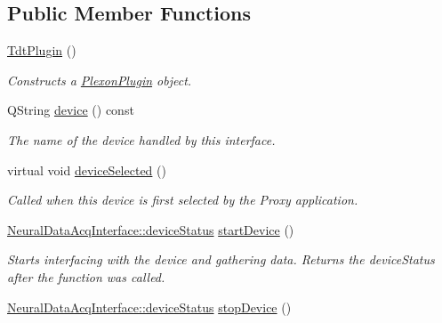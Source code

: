 \subsection*{Public Member Functions}
\begin{DoxyCompactItemize}
\item 
\hypertarget{class_tdt_plugin_a87b239c83c34ea24d4e96633ed293ce8}{\hyperlink{class_tdt_plugin_a87b239c83c34ea24d4e96633ed293ce8}{Tdt\-Plugin} ()}\label{class_tdt_plugin_a87b239c83c34ea24d4e96633ed293ce8}

\begin{DoxyCompactList}\small\item\em Constructs a \hyperlink{class_plexon_plugin}{Plexon\-Plugin} object. \end{DoxyCompactList}\item 
\hypertarget{class_tdt_plugin_aa88fcee8761632906f9a83c1f2a249ca}{Q\-String \hyperlink{class_tdt_plugin_aa88fcee8761632906f9a83c1f2a249ca}{device} () const }\label{class_tdt_plugin_aa88fcee8761632906f9a83c1f2a249ca}

\begin{DoxyCompactList}\small\item\em The name of the device handled by this interface. \end{DoxyCompactList}\item 
\hypertarget{class_tdt_plugin_a116c79f3b024cb4fe2077cae0afe36e1}{virtual void \hyperlink{class_tdt_plugin_a116c79f3b024cb4fe2077cae0afe36e1}{device\-Selected} ()}\label{class_tdt_plugin_a116c79f3b024cb4fe2077cae0afe36e1}

\begin{DoxyCompactList}\small\item\em Called when this device is first selected by the Proxy application. \end{DoxyCompactList}\item 
\hyperlink{class_neural_data_acq_interface_a18d2ffb89521e40cba91a159e47fd449}{Neural\-Data\-Acq\-Interface\-::device\-Status} \hyperlink{class_tdt_plugin_a67319b997851288c25ee517e8c2eaad4}{start\-Device} ()
\begin{DoxyCompactList}\small\item\em Starts interfacing with the device and gathering data. Returns the device\-Status after the function was called. \end{DoxyCompactList}\item 
\hypertarget{class_tdt_plugin_a0502506ca2205b617b65ec49369f1f3a}{\hyperlink{class_neural_data_acq_interface_a18d2ffb89521e40cba91a159e47fd449}{Neural\-Data\-Acq\-Interface\-::device\-Status} \hyperlink{class_tdt_plugin_a0502506ca2205b617b65ec49369f1f3a}{stop\-Device} ()}\label{class_tdt_plugin_a0502506ca2205b617b65ec49369f1f3a}


\end{DoxyCompactItemize}
